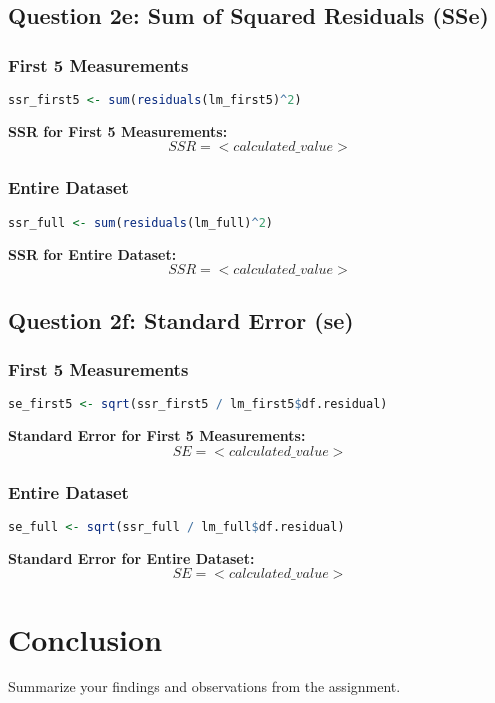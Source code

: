 \documentclass{article}
\begin{document}
\subsection{Question 2e: Sum of Squared Residuals (SSe)}
\subsubsection{First 5 Measurements}
\begin{lstlisting}[language=R]
ssr_first5 <- sum(residuals(lm_first5)^2)
\end{lstlisting}
\textbf{SSR for First 5 Measurements:} \[ SSR = <calculated\_value> \]

\subsubsection{Entire Dataset}
\begin{lstlisting}[language=R]
ssr_full <- sum(residuals(lm_full)^2)
\end{lstlisting}
\textbf{SSR for Entire Dataset:} \[ SSR = <calculated\_value> \]

\subsection{Question 2f: Standard Error (se)}
\subsubsection{First 5 Measurements}
\begin{lstlisting}[language=R]
se_first5 <- sqrt(ssr_first5 / lm_first5$df.residual)
\end{lstlisting}
\textbf{Standard Error for First 5 Measurements:} \[ SE = <calculated\_value> \]

\subsubsection{Entire Dataset}
\begin{lstlisting}[language=R]
se_full <- sqrt(ssr_full / lm_full$df.residual)
\end{lstlisting}
\textbf{Standard Error for Entire Dataset:} \[ SE = <calculated\_value> \]

\section{Conclusion}
Summarize your findings and observations from the assignment.
\end{document}
